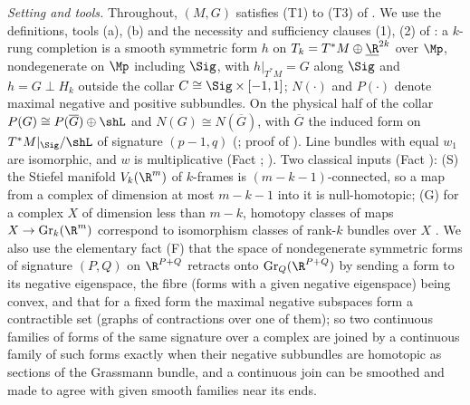 \emph{Setting and tools.} Throughout, $(M,G)$ satisfies (T1) to (T3) of . We use the definitions, tools (a), (b) and the necessity and sufficiency clauses (1), (2) of : a $k$-rung completion is a smooth symmetric form $h$ on $T_k = T^*M \oplus \underline{\R}^{2k}$ over $\Mp$, nondegenerate on $\Mp$ including $\Sig$, with $h|_{T^*M} = G$ along $\Sig$ and $h = G \perp H_k$ outside the collar $C \cong \Sig \times [-1,1]$; $N(\cdot)$ and $P(\cdot)$ denote maximal negative and positive subbundles. On the physical half of the collar $P(G) \cong P(\overline G) \oplus \shL$ and $N(G) \cong N(\overline G)$, with $\overline G$ the induced form on $T^*M|_\Sig/\shL$ of signature $(p-1, q)$ (; proof of ). Line bundles with equal $w_1$ are isomorphic, and $w$ is multiplicative (Fact ; \cite[\S 4]{MilnorStasheff1974}). Two classical inputs (Fact ): (S) the Stiefel manifold $V_k(\R^m)$ of $k$-frames is $(m-k-1)$-connected, so a map from a complex of dimension at most $m - k - 1$ into it is null-homotopic; (G) for a complex $X$ of dimension less than $m - k$, homotopy classes of maps $X \to \mathrm{Gr}_k(\R^m)$ correspond to isomorphism classes of rank-$k$ bundles over $X$ \cite[\S 5]{MilnorStasheff1974}. We also use the elementary fact (F) that the space of nondegenerate symmetric forms of signature $(P,Q)$ on $\R^{P+Q}$ retracts onto $\mathrm{Gr}_Q(\R^{P+Q})$ by sending a form to its negative eigenspace, the fibre (forms with a given negative eigenspace) being convex, and that for a fixed form the maximal negative subspaces form a contractible set (graphs of contractions over one of them); so two continuous families of forms of the same signature over a complex are joined by a continuous family of such forms exactly when their negative subbundles are homotopic as sections of the Grassmann bundle, and a continuous join can be smoothed and made to agree with given smooth families near its ends.

